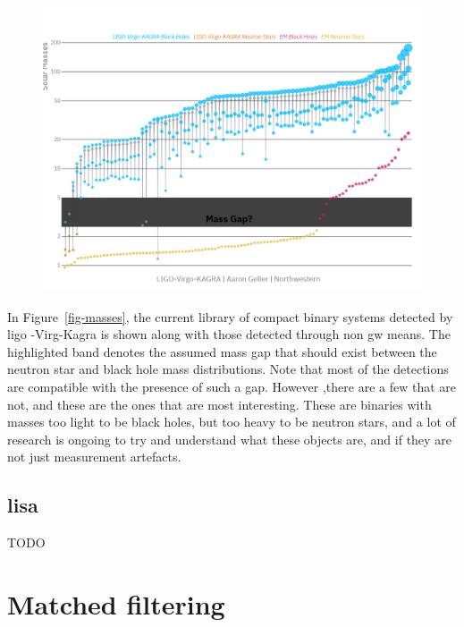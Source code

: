 \documentclass[
  10pt,
  a4paper,
  DIV=11,
  numbers=noendperiod,
  oneside]{scrreprt}
\DeclareRobustCommand{\[}{\begin{equation}}
\DeclareRobustCommand{\]}{\end{equation}}
\begin{document}
\begin{figure}


{\centering \includegraphics{./Masses_of_Dead_Stars_LIGO_Virgo_KAGRA.png}

}

\end{figure}

In Figure~\ref{fig-masses}, the current library of compact binary
systems detected by \gls{ligo} -Virg-Kagra is shown along with those
detected through non \gls{gw} means. The highlighted band denotes the
assumed mass gap that should exist between the neutron star and black
hole mass distributions. Note that most of the detections are compatible
with the presence of such a gap. However ,there are a few that are not,
and these are the ones that are most interesting. These are binaries
with masses too light to be black holes, but too heavy to be neutron
stars, and a lot of research is ongoing to try and understand what these
objects are, and if they are not just measurement artefacts.

\hypertarget{lisa}{%
\subsection{\texorpdfstring{\gls{lisa}}{}}\label{lisa}}

TODO

\hypertarget{matched-filtering}{%
\section{Matched filtering}\label{matched-filtering}}
\end{document}
